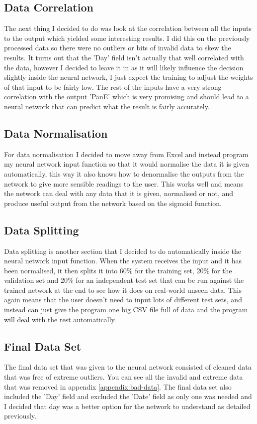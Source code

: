 \documentclass[10pt, a4paper]{article}
\begin{document}
\subsection{Data Correlation}
The next thing I decided to do was look at the correlation between all the inputs to the output which yielded some interesting results. I did this on the previously processed data so there were no outliers or bits of invalid data to skew the results. It turns out that the 'Day' field isn't actually that well correlated with the data, however I decided to leave it in as it will likely influence the decision slightly inside the neural network, I just expect the training to adjust the weights of that input to be fairly low. The rest of the inputs have a very strong correlation with the output 'PanE' which is very promising and should lead to a neural network that can predict what the result is fairly accurately.

\subsection{Data Normalisation}
For data normalisation I decided to move away from Excel and instead program my neural network input function so that it would normalise the data it is given automatically, this way it also knows how to denormalise the outputs from the network to give more sensible readings to the user. This works well and means the network can deal with any data that it is given, normalised or not, and produce useful output from the network based on the sigmoid function.

\subsection{Data Splitting}
Data splitting is another section that I decided to do automatically inside the neural network input function. When the system receives the input and it has been normalised, it then splits it into 60\% for the training set, 20\% for the validation set and 20\% for an independent test set that can be run against the trained network at the end to see how it does on real-world unseen data. This again means that the user doesn't need to input lots of different test sets, and instead can just give the program one big CSV file full of data and the program will deal with the rest automatically.

\subsection{Final Data Set}
The final data set that was given to the neural network consisted of cleaned data that was free of extreme outliers. You can see all the invalid and extreme data that was removed in appendix \ref{appendix:bad-data}. The final data set also included the 'Day' field and excluded the 'Date' field as only one was needed and I decided that day was a better option for the network to understand as detailed previously.
\end{document}
